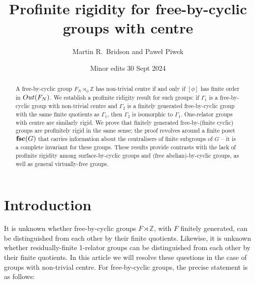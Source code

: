 \documentclass[11pt, a4 paper]{amsart}
\numberwithin{equation}{section}
\theoremstyle{remark}
\theoremstyle{definition}
\def\Z{\mathbb Z}
\def\tsc{{\rm{\bf{fsc}}}}
\begin{document}
\title[Profinite rigidity for free-by-cyclic groups with centre]
{Profinite rigidity for free-by-cyclic groups with centre}

\author[Martin R. Bridson and Pawe\l{} Piwek]
{Martin R.~Bridson and Pawe\l{} Piwek}
\address{Mathematical Institute\\
	Andrew Wiles Building\\
	ROQ, Woodstock Road\\
	Oxford\\
	United Kingdom}


\date{Minor edits 30 Sept 2024}





\begin{abstract} 
	A free-by-cyclic group $F_N\rtimes_\phi\Z$ has non-trivial centre if and only if 
	$[\phi]$ has finite order in ${\rm{Out}}(F_N)$. 
	We establish a profinite ridigity result for such groups: 
	if $\Gamma_1$ is a free-by-cyclic group with non-trivial centre 
	and $\Gamma_2$ is a finitely generated free-by-cyclic group 
	with the same finite quotients as $\Gamma_1$, 
	then $\Gamma_2$ is isomorphic to $\Gamma_1$. 
	One-relator groups with centre are similarly rigid. 
	We prove that finitely generated free-by-(finite cyclic) groups 
	are profinitely rigid in the same sense; 
	the proof revolves around a finite poset $\tsc(G)$ 
	that carries information about the centralisers of finite subgroups of $G$ 
	-- it is a complete invariant for these groups.  
	These results provide contrasts with 
	the lack of profinite rigidity among 
	surface-by-cyclic groups
	and (free abelian)-by-cyclic groups, 
	as well as general virtually-free groups. 
\end{abstract}


\maketitle


\section{Introduction}
\label{s:introduction}

It is unknown whether free-by-cyclic groups $F\rtimes\Z$, 
with $F$ finitely generated, 
can be distinguished from each other by their finite quotients. 
Likewise, it is unknown whether 
residually-finite 1-relator groups 
can be distinguished from each other by their finite quotients. 
In this article we will resolve these questions 
in the case of groups with non-trivial centre. 
For free-by-cyclic groups, the precise statement is as follows:
\end{document}
